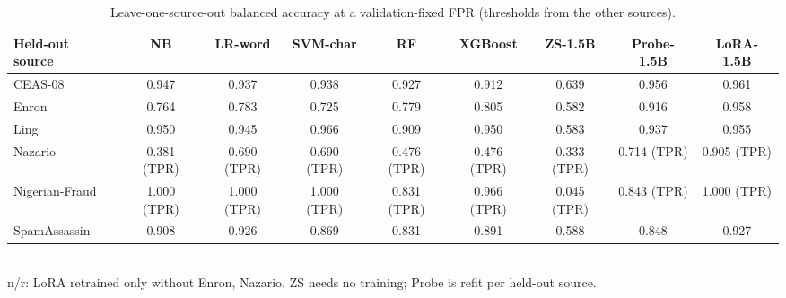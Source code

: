 \begin{table}[t]
\centering
\caption{Leave-one-source-out balanced accuracy at a validation-fixed FPR (thresholds from the other sources).}
\label{tab:loso}
\footnotesize
\begin{tabular}{lcccccccc}
\toprule
\textbf{Held-out source} & \textbf{NB} & \textbf{LR-word} & \textbf{SVM-char} & \textbf{RF} & \textbf{XGBoost} & \textbf{ZS-1.5B} & \textbf{Probe-1.5B} & \textbf{LoRA-1.5B} \\
\midrule
CEAS-08 & 0.947 & 0.937 & 0.938 & 0.927 & 0.912 & 0.639 & 0.956 & 0.961 \\
Enron & 0.764 & 0.783 & 0.725 & 0.779 & 0.805 & 0.582 & 0.916 & 0.958 \\
Ling & 0.950 & 0.945 & 0.966 & 0.909 & 0.950 & 0.583 & 0.937 & 0.955 \\
Nazario & 0.381 (TPR) & 0.690 (TPR) & 0.690 (TPR) & 0.476 (TPR) & 0.476 (TPR) & 0.333 (TPR) & 0.714 (TPR) & 0.905 (TPR) \\
Nigerian-Fraud & 1.000 (TPR) & 1.000 (TPR) & 1.000 (TPR) & 0.831 (TPR) & 0.966 (TPR) & 0.045 (TPR) & 0.843 (TPR) & 1.000 (TPR) \\
SpamAssassin & 0.908 & 0.926 & 0.869 & 0.831 & 0.891 & 0.588 & 0.848 & 0.927 \\
\bottomrule
\end{tabular}
\\[2pt]{\scriptsize n/r: LoRA retrained only without Enron, Nazario. ZS needs no training; Probe is refit per held-out source.}
\end{table}